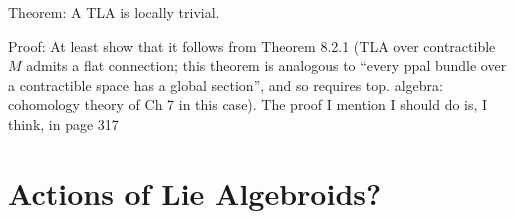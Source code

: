 Theorem: A TLA is locally trivial.

Proof: At least show that it follows from Theorem 8.2.1 (TLA over contractible $M$ admits a flat connection; this theorem is analogous to ``every ppal bundle over a contractible space has a global section'', and so requires top. algebra: cohomology theory of Ch 7 in this case). The proof I mention I should do is, I think, in page 317

\section{Actions of Lie Algebroids?}


